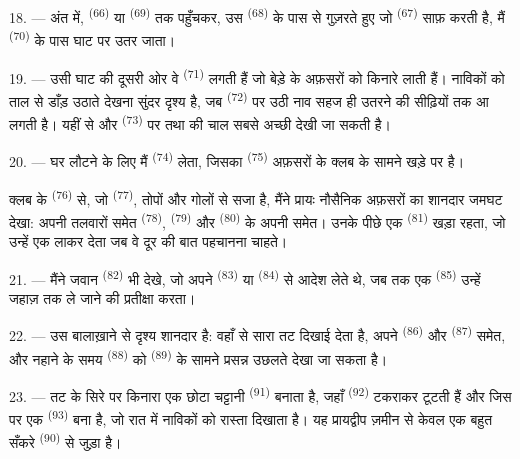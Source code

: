 18. --- अंत में,  \textsuperscript{(66)} या
 \textsuperscript{(69)} तक पहुँचकर, उस 
\textsuperscript{(68)} के पास से गुज़रते हुए जो  \textsuperscript{(67)}
साफ़ करती है, मैं  \textsuperscript{(70)} के पास घाट पर उतर
जाता।

19. --- उसी घाट की दूसरी ओर वे  \textsuperscript{(71)} लगती हैं
जो बेड़े के अफ़सरों को किनारे लाती हैं। नाविकों को ताल से डाँड़ उठाते देखना सुंदर
दृश्य है, जब  \textsuperscript{(72)} पर उठी नाव सहज ही उतरने की
सीढ़ियों तक आ लगती है। यहीं से  और  \textsuperscript{(73)}
पर  तथा  की चाल सबसे अच्छी देखी जा सकती है।

\VUsaut{3.0mm}
\VUsaut{3.0mm}

20. --- घर लौटने के लिए मैं  \textsuperscript{(74)} लेता,
जिसका  \textsuperscript{(75)} अफ़सरों के क्लब के सामने खड़े
 पर है।

क्लब के  \textsuperscript{(76)} से, जो 
\textsuperscript{(77)}, तोपों और गोलों से सजा है, मैंने प्रायः नौसैनिक अफ़सरों का
शानदार जमघट देखा: अपनी तलवारों समेत 
\textsuperscript{(78)},  \textsuperscript{(79)} और
 \textsuperscript{(80)} के  अपनी
 समेत। उनके पीछे एक  \textsuperscript{(81)} खड़ा
रहता, जो उन्हें एक  लाकर देता जब वे दूर की बात पहचानना चाहते।

21. --- मैंने जवान  \textsuperscript{(82)} भी देखे, जो
अपने  \textsuperscript{(83)} या  \textsuperscript{(84)}
से आदेश लेते थे, जब तक एक  \textsuperscript{(85)} उन्हें
जहाज़ तक ले जाने की प्रतीक्षा करता।

22. --- उस बालाख़ाने से दृश्य शानदार है: वहाँ से सारा तट दिखाई देता है, अपने
 \textsuperscript{(86)} और 
\textsuperscript{(87)} समेत, और नहाने के समय 
\textsuperscript{(88)} को  \textsuperscript{(89)} के सामने प्रसन्न
उछलते देखा जा सकता है।

23. --- तट के सिरे पर किनारा एक छोटा चट्टानी 
\textsuperscript{(91)} बनाता है, जहाँ  \textsuperscript{(92)} टकराकर
टूटती हैं और जिस पर एक  \textsuperscript{(93)} बना है, जो
रात में नाविकों को रास्ता दिखाता है। यह प्रायद्वीप ज़मीन से केवल एक बहुत सँकरे
 \textsuperscript{(90)} से जुड़ा है।

